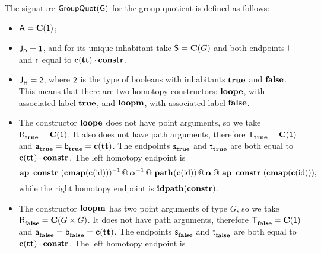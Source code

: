 The signature $\groupquot G$ for the group quotient is defined as follows:
\begin{itemize}
\item $\pointconstr = \constantP{\unit}$;
\item $\pathlabel = \unit$, and for its unique inhabitant take $\patharg = \constantP{G}$ and both endpoints $\pathleft$ and $\pathright$ equal to $\comp{\Ce(\unitt)}{\constr}$.
\item $\homotlabel = \bool$, where $\bool$ is the type of
booleans with inhabitants $\booltrue$ and $\boolfalse$. This means
that there are two homotopy constructors: $\groupquotloope$, with
associated label $\booltrue$, and $\groupquotloopm$, with associated
label $\boolfalse$.
\item The constructor $\groupquotloope$ does not have
point arguments, so we take $\homotpointarg_{\booltrue}
= \constantP{\unit}$. It also does not have path arguments, therefore
$\homotpathtarg_{\booltrue} = \constantP{\unit}$ and
$\pathargleft_{\booltrue} = \pathargright_{\booltrue} = \Ce(\unitt)$.
The endpoints $\homotpathleft_{\booltrue}$ and
$\homotpathright_{\booltrue}$ are both equal to
$\comp{\Ce(\unitt)}{\constr}$. The left homotopy endpoint is
\[
\hconcat{\hap{\constr}{\hinv{(\hcompconst{\Ce(\id)})}}}{
\hconcat{\hinv{\hassocN}}{
\hconcat{\hconstr{}{\Ce(\id)}}{
\hconcat{\hassocN}{\hap{\constr}{(\hcompconst{\Ce(\id)})}}
}}},
\]
while the right homotopy endpoint is $\hrefl{\constr}$.
\item The constructor $\groupquotloopm$ has two point
arguments of type $G$, so we take $\homotpointarg_{\boolfalse}
= \constantP{G \times G}$. It does not have path arguments, therefore
$\homotpathtarg_{\boolfalse} = \constantP{\unit}$ and
$\pathargleft_{\boolfalse} = \pathargright_{\boolfalse}
= \Ce(\unitt)$.  The endpoints $\homotpathleft_{\boolfalse}$ and
$\homotpathright_{\boolfalse}$ are both equal to
$\comp{\Ce(\unitt)}{\constr}$. The left homotopy endpoint is

\end{itemize}
